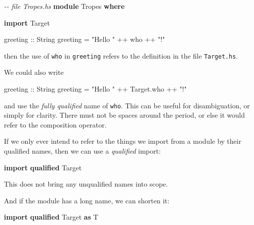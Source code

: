 \documentclass[11pt,
  american,
  DIV13]{article}
\newenvironment{Shaded}{}{}
\newcommand{\CommentTok}[1]{\textcolor[rgb]{0.38,0.63,0.69}{\textit{#1}}}
\newcommand{\DataTypeTok}[1]{\textcolor[rgb]{0.56,0.13,0.00}{#1}}
\newcommand{\KeywordTok}[1]{\textcolor[rgb]{0.00,0.44,0.13}{\textbf{#1}}}
\newcommand{\NormalTok}[1]{#1}
\newcommand{\OperatorTok}[1]{\textcolor[rgb]{0.40,0.40,0.40}{#1}}
\newcommand{\OtherTok}[1]{\textcolor[rgb]{0.00,0.44,0.13}{#1}}
\newcommand{\StringTok}[1]{\textcolor[rgb]{0.25,0.44,0.63}{#1}}
\begin{document}
\begin{Shaded}
\begin{Highlighting}[]
\CommentTok{{-}{-} file Tropes.hs}
\KeywordTok{module} \DataTypeTok{Tropes} \KeywordTok{where}

\KeywordTok{import} \DataTypeTok{Target}

\OtherTok{greeting ::} \DataTypeTok{String}
\NormalTok{greeting }\OtherTok{=} \StringTok{"Hello "} \OperatorTok{++}\NormalTok{ who }\OperatorTok{++} \StringTok{"!"}
\end{Highlighting}
\end{Shaded}

then the use of \texttt{who} in \texttt{greeting} refers to the
definition in the file \texttt{Target.hs}.

We could also write

\begin{Shaded}
\begin{Highlighting}[]
\OtherTok{greeting ::} \DataTypeTok{String}
\NormalTok{greeting }\OtherTok{=} \StringTok{"Hello "} \OperatorTok{++}\NormalTok{ Target.who }\OperatorTok{++} \StringTok{"!"}
\end{Highlighting}
\end{Shaded}

and use the \emph{fully qualified} name of \texttt{who}. This can be
useful for disambiguation, or simply for clarity. There must not be
spaces around the period, or else it would refer to the composition
operator.

If we only ever intend to refer to the things we import from a module by
their qualified names, then we can use a \emph{qualified} import:

\begin{Shaded}
\begin{Highlighting}[]
\KeywordTok{import} \KeywordTok{qualified} \DataTypeTok{Target}
\end{Highlighting}
\end{Shaded}

This does not bring any unqualified names into scope.

And if the module has a long name, we can shorten it:

\begin{Shaded}
\begin{Highlighting}[]
\KeywordTok{import} \KeywordTok{qualified} \DataTypeTok{Target} \KeywordTok{as} \DataTypeTok{T}
\end{Highlighting}
\end{Shaded}
\end{document}
